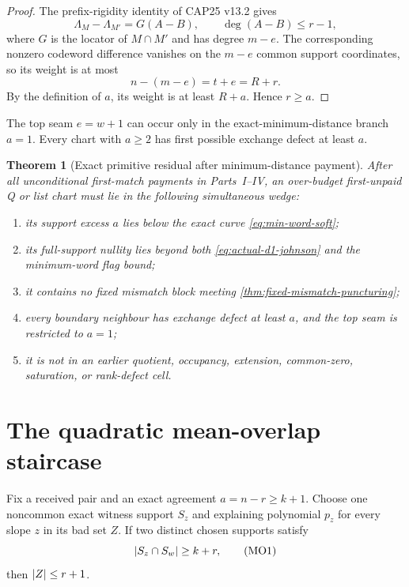 \documentclass[11pt,a4paper]{amsart}
\numberwithin{equation}{section}
\newtheorem{theorem}{Theorem}[section]
\theoremstyle{remark}
\begin{document}
\begin{proof}
The prefix-rigidity identity of CAP25 v13.2 gives
\[
 \Lambda_M-\Lambda_{M'}=G(A-B),
 \qquad \deg(A-B)\le r-1,
\]
where $G$ is the locator of $M\cap M'$ and has degree $m-e$.  The corresponding nonzero codeword difference vanishes on the $m-e$ common support coordinates, so its weight is at most
\[
 n-(m-e)=t+e=R+r.
\]
By the definition of $a$, its weight is at least $R+a$.  Hence $r\ge a$.
\end{proof}

\begin{corollary}
\label{cor:top-seam-localization}
The top seam $e=w+1$ can occur only in the exact-minimum-distance branch $a=1$.  Every chart with $a\ge2$ has first possible exchange defect at least $a$.
\end{corollary}

\begin{theorem}[Exact primitive residual after minimum-distance payment]
\label{thm:min-distance-residual}
After all unconditional first-match payments in Parts~I--IV, an over-budget first-unpaid Q or list chart must lie in the following simultaneous wedge:
\begin{enumerate}[label=\textup{(R\arabic*)}]
\item its support excess $a$ lies below the exact curve \eqref{eq:min-word-soft};
\item its full-support nullity lies beyond both \eqref{eq:actual-d1-johnson} and the minimum-word flag bound;
\item it contains no fixed mismatch block meeting \cref{thm:fixed-mismatch-puncturing};
\item every boundary neighbour has exchange defect at least $a$, and the top seam is restricted to $a=1$;
\item it is not in an earlier quotient, occupancy, extension, common-zero, saturation, or rank-defect cell.
\end{enumerate}
\end{theorem}


\section{The quadratic mean-overlap staircase}\label{sec:mean-overlap-v3}
\begin{lemma}
\label{lem:large-overlap-collapse}
Fix a received pair and an exact agreement \(a=n-r\ge k+1\).  Choose one
noncommon exact witness support \(S_z\) and explaining polynomial \(p_z\)
for every slope \(z\) in its bad set \(Z\).  If two distinct chosen
supports satisfy
\[
                    \lvert S_z\cap S_w\rvert\ge k+r,       \tag{MO1}
\label{eq:large-overlap-collapse}
\]
then \(\lvert Z\rvert\le r+1\).
\end{lemma}
\end{document}
